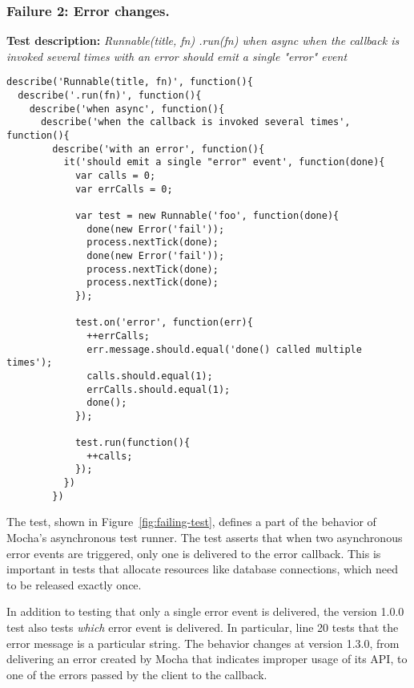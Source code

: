 \subsubsection{Failure 2: Error changes.}
\label{sec:failure2}
{\bf Test description: }
%
{\em Runnable(title, fn) .run(fn) when async when the callback is
  invoked several times with an error should emit a single "error"
  event }

\begin{figure*}
\begin{lstlisting}
describe('Runnable(title, fn)', function(){
  describe('.run(fn)', function(){
    describe('when async', function(){
      describe('when the callback is invoked several times', function(){
        describe('with an error', function(){
          it('should emit a single "error" event', function(done){
            var calls = 0;
            var errCalls = 0;

            var test = new Runnable('foo', function(done){
              done(new Error('fail'));
              process.nextTick(done);
              done(new Error('fail'));
              process.nextTick(done);
              process.nextTick(done);
            });

            test.on('error', function(err){
              ++errCalls;
              err.message.should.equal('done() called multiple times');
              calls.should.equal(1);
              errCalls.should.equal(1);
              done();
            });

            test.run(function(){
              ++calls;
            });
          })
        })
\end{lstlisting}
\caption{A failing mocha {\tt jsapi} test}
\label{fig:failing-test}
\end{figure*}

The test, shown in Figure~\ref{fig:failing-test}, defines a
part of the behavior of Mocha's asynchronous test runner. The test 
asserts that when two asynchronous error events are triggered, only one
is delivered to the error callback. This is important in tests that
allocate resources like database connections, which need to be released
exactly once.

In addition to testing that only a single error event is delivered,
the version 1.0.0 test also tests {\em which} error event is
delivered. In particular, line 20 tests that the error message is a
particular string. The behavior changes at version 1.3.0, from
delivering an error created by Mocha that indicates improper usage of
its API, to one of the errors passed by the client to the callback.

